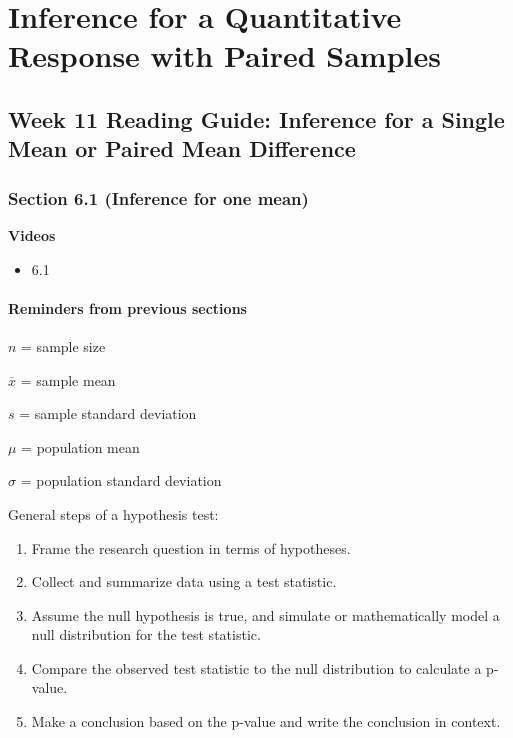 \documentclass[
]{report}
\providecommand{\tightlist}{%
  \setlength{\itemsep}{0pt}\setlength{\parskip}{0pt}}
\begin{document}
\newpage

\hypertarget{inference-for-a-quantitative-response-with-paired-samples}{%
\chapter{Inference for a Quantitative Response with Paired Samples}\label{inference-for-a-quantitative-response-with-paired-samples}}

\hypertarget{week-11-reading-guide-inference-for-a-single-mean-or-paired-mean-difference}{%
\section{Week 11 Reading Guide: Inference for a Single Mean or Paired Mean Difference}\label{week-11-reading-guide-inference-for-a-single-mean-or-paired-mean-difference}}

\hypertarget{section-6.1-inference-for-one-mean}{%
\subsection*{Section 6.1 (Inference for one mean)}\label{section-6.1-inference-for-one-mean}}

\textbf{Videos}

\begin{itemize}
\tightlist
\item
  6.1
\end{itemize}


\hypertarget{reminders-from-previous-sections-5}{%
\subsubsection*{Reminders from previous sections}\label{reminders-from-previous-sections-5}}

\(n\) = sample size

\(\overline{x}\) = sample mean

\(s\) = sample standard deviation

\(\mu\) = population mean

\(\sigma\) = population standard deviation

General steps of a hypothesis test:

\begin{enumerate}
\def\labelenumi{\arabic{enumi}.}
\item
  Frame the research question in terms of hypotheses.
\item
  Collect and summarize data using a test statistic.
\item
  Assume the null hypothesis is true, and simulate or mathematically model a null distribution for the test statistic.
\item
  Compare the observed test statistic to the null distribution to calculate a p-value.
\item
  Make a conclusion based on the p-value and write the conclusion in context.
\end{enumerate}
\end{document}
